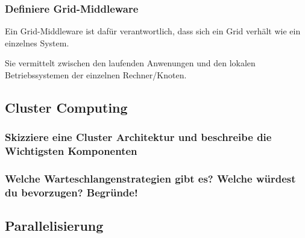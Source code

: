 \subsubsection{Definiere Grid-Middleware}
	Ein Grid-Middleware ist daf\"ur verantwortlich,
	dass sich ein Grid verh\"alt wie ein einzelnes System.
	
	Sie vermittelt zwischen den laufenden Anwenungen und den lokalen
	Betriebssystemen der einzelnen Rechner/Knoten.

\subsection{Cluster Computing}
	\subsubsection{Skizziere eine Cluster Architektur und beschreibe die
	Wichtigsten Komponenten}
	\subsubsection{Welche Warteschlangenstrategien gibt es? Welche w\"urdest du
	bevorzugen? Begr\"unde!}
\subsection{Parallelisierung}
\small

\normalsize
